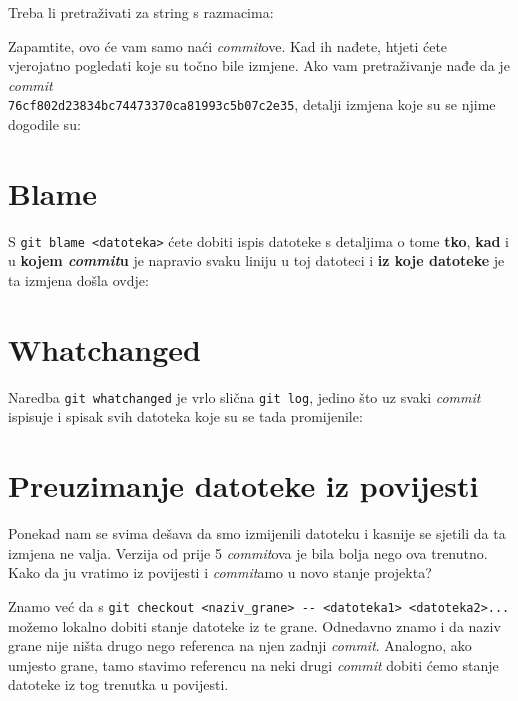 
Treba li pretraživati za string s razmacima:


Zapamtite, ovo će vam samo naći \emph{commit}ove.
Kad ih nađete, htjeti ćete vjerojatno pogledati koje su točno bile izmjene.
Ako vam pretraživanje nađe da je \emph{commit} \\ \verb+76cf802d23834bc74473370ca81993c5b07c2e35+, detalji izmjena koje su se njime dogodile su:


\section*{Blame}

S \verb+git blame <datoteka>+ ćete dobiti ispis datoteke s detaljima o tome \textbf{tko}, \textbf{kad} i u \textbf{kojem \emph{commit}u} je napravio svaku liniju u toj datoteci i \textbf{iz koje datoteke} je ta izmjena došla ovdje:



\section*{Whatchanged}

Naredba \verb+git whatchanged+ je vrlo slična \verb+git log+, jedino što uz svaki \emph{commit} ispisuje i spisak svih datoteka koje su se tada promijenile:



\section*{Preuzimanje datoteke iz povijesti}

Ponekad nam se svima dešava da smo izmijenili datoteku i kasnije se sjetili da ta izmjena ne valja. 
Verzija od prije 5 \emph{commit}ova je bila bolja nego ova trenutno.
Kako da ju vratimo iz povijesti i \emph{commit}amo u novo stanje projekta?

Znamo već da s \verb+git checkout <naziv_grane> -- <datoteka1> <datoteka2>...+ možemo lokalno dobiti stanje datoteke iz te grane.
Odnedavno znamo i da naziv grane nije ništa drugo nego referenca na njen zadnji \emph{commit}.
Analogno, ako umjesto grane, tamo stavimo referencu na neki drugi \emph{commit} dobiti ćemo stanje datoteke iz tog trenutka u povijesti.

